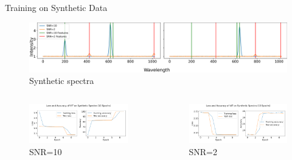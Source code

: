 \begin{frame}{Training on Synthetic Data}
    \begin{figure}[t]
        \centering
        \includegraphics[width=\textwidth]{figures/synth_data_new.png}
        \caption{Synthetic spectra}
        \label{fig:synth_spectra}
    \end{figure}
    \begin{columns}
        \begin{figure}
            \centering
            \includegraphics[width=\textwidth]{figures/pre_testing/SNR10_training_epoch.png}
            \caption{SNR=10}
        \end{figure}
        \begin{figure}
            \centering
            \includegraphics[width=\textwidth]{figures/pre_testing/SNR2_training_epoch.png}
            \caption{SNR=2}
        \end{figure}
    \end{columns}
\end{frame}

